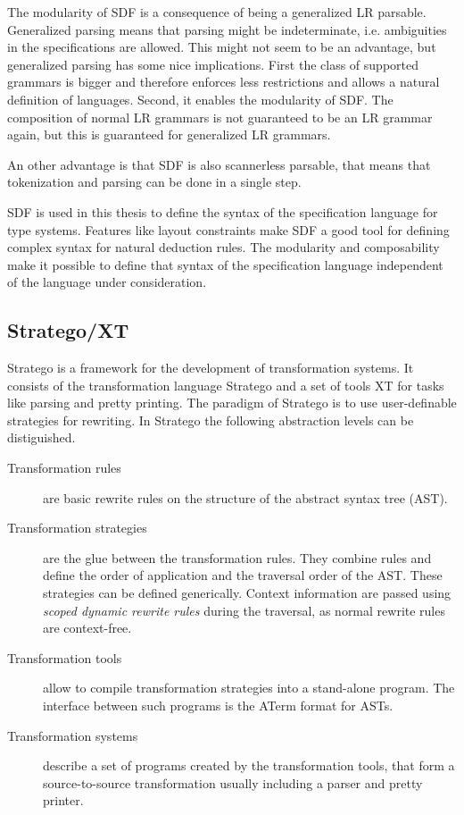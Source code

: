 \documentclass[a4paper,twoside]{report}
\begin{document}
The modularity of SDF is a consequence of being a generalized LR
parsable. Generalized parsing means that parsing might be
indeterminate, i.e. ambiguities in the specifications are
allowed. This might not seem to be an advantage, but generalized
parsing has some nice implications. First the class of supported
grammars is bigger and therefore enforces less restrictions and allows
a natural definition of languages. Second, it enables the modularity
of SDF. The composition of normal LR grammars is not guaranteed to be
an LR grammar again, but this is guaranteed for generalized LR
grammars.

An other advantage is that SDF is also scannerless parsable, that
means that tokenization and parsing can be done in a single step.


SDF is used in this thesis to define the syntax of the specification
language for type systems. Features like layout constraints make SDF a
good tool for defining complex syntax for natural deduction rules. The
modularity and composability make it possible to define that syntax of
the specification language independent of the language under
consideration.
\subsection{Stratego/XT}
Stratego is a framework for the development of transformation
systems. It consists of the transformation language Stratego and a set
of tools XT for tasks like parsing and pretty printing. The paradigm
of Stratego is to use user-definable strategies for
rewriting. In Stratego the following abstraction levels can be
distiguished.

\begin{description}
\item[Transformation rules] are basic rewrite rules on the structure
  of the abstract syntax tree (AST).
\item[Transformation strategies] are the glue between the
  transformation rules. They combine rules and define the order of
  application and the traversal order of the AST. These strategies can
  be defined generically. Context information are passed using
  \textit{scoped dynamic rewrite rules} during the traversal, as
  normal rewrite rules are context-free.
\item[Transformation tools] allow to compile transformation strategies
  into a stand-alone program. The interface between such programs is
  the ATerm format for ASTs.
\item[Transformation systems] describe a set of programs created by
  the transformation tools, that form a source-to-source
  transformation usually including a parser and pretty printer.
\end{description}
\end{document}

